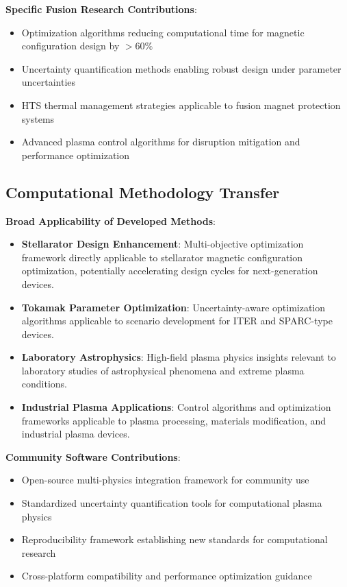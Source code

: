 \documentclass[12pt,a4paper]{article}
\begin{document}
\textbf{Specific Fusion Research Contributions}:
\begin{itemize}
\item Optimization algorithms reducing computational time for magnetic configuration design by $>60\%$
\item Uncertainty quantification methods enabling robust design under parameter uncertainties
\item HTS thermal management strategies applicable to fusion magnet protection systems
\item Advanced plasma control algorithms for disruption mitigation and performance optimization
\end{itemize}

\subsection{Computational Methodology Transfer}

\textbf{Broad Applicability of Developed Methods}:
\begin{itemize}
\item \textbf{Stellarator Design Enhancement}: Multi-objective optimization framework directly applicable to stellarator magnetic configuration optimization, potentially accelerating design cycles for next-generation devices.
\item \textbf{Tokamak Parameter Optimization}: Uncertainty-aware optimization algorithms applicable to scenario development for ITER and SPARC-type devices.
\item \textbf{Laboratory Astrophysics}: High-field plasma physics insights relevant to laboratory studies of astrophysical phenomena and extreme plasma conditions.
\item \textbf{Industrial Plasma Applications}: Control algorithms and optimization frameworks applicable to plasma processing, materials modification, and industrial plasma devices.
\end{itemize}

\textbf{Community Software Contributions}:
\begin{itemize}
\item Open-source multi-physics integration framework for community use
\item Standardized uncertainty quantification tools for computational plasma physics
\item Reproducibility framework establishing new standards for computational research
\item Cross-platform compatibility and performance optimization guidance
\end{itemize}
\end{document}
